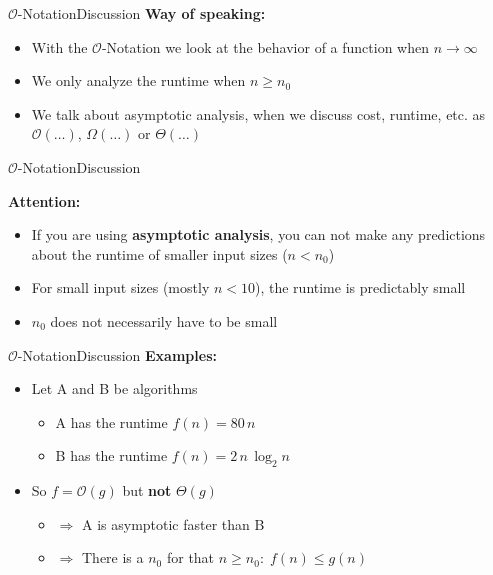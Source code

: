 
\begin{frame}{$\mathcal{O}$-Notation}{Discussion}
  \textbf{Way of speaking:}
  \begin{itemize}
    \item
      With the $\mathcal{O}$-Notation we look at the behavior of a function when
      $n \to \infty$
    \item
      We only analyze the runtime when $n \geq n_0$
    \item
      We talk about {\color{MainA}asymptotic analysis}, when we discuss 
      cost, runtime, etc. as $\mathcal{O}(\ldots)$, $\Omega(\ldots)$
      or $\Theta(\ldots)$
  \end{itemize}
\end{frame}


\begin{frame}{$\mathcal{O}$-Notation}{Discussion}
  \begin{alertblock}{\textbf{Attention:}}
    \begin{itemize}
      \item
        If you are using \textbf{asymptotic analysis}, you can not make any
        predictions about the runtime of smaller input sizes ($n < n_0$)
      \item
        For small input sizes (mostly $n < 10$),
        the runtime is predictably small
      \item
        $n_0$ does not necessarily have to be small
    \end{itemize}
  \end{alertblock}
\end{frame}


\begin{frame}{$\mathcal{O}$-Notation}{Discussion}
  \textbf{Examples:}
  \begin{itemize}
    \item
    Let A and B be algorithms
    \begin{itemize}
      \item
        A has the runtime $f(n) = 80 \, n$
      \item
        B has the runtime $f(n) = 2 \, n \, \log_2 n$
    \end{itemize}
    \item
      So $f = \mathcal{O}(g)$ but \textbf{not} $\Theta(g)$
      \begin{itemize}
        \item
          $\Rightarrow$ A is asymptotic faster than B
        \item
          $\Rightarrow$
          There is a $n_0$ for that $n \geq n_0\!: \; f(n) \leq g(n)$
      \end{itemize}
  \end{itemize}
\end{frame}

